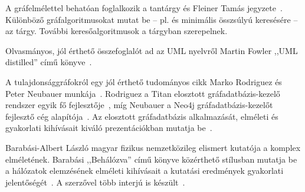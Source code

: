 A gráfelmélettel behatóan foglalkozik a \bszketto tantárgy és Fleiner Tamás jegyzete~\cite{FleinerJegyzet}. Különböző gráfalgoritmusokat mutat be -- pl.  és minimális összsúlyú  keresésére -- az \algel tárgy. További keresőalgoritmusok a \mestersegesintelligencia tárgyban szerepelnek.

Olvasmányos, jól érthető összefoglalót ad az UML nyelvről Martin Fowler ,,UML distilled'' című könyve~\cite{fowler1997uml}.

A tulajdonsággráfokról egy jól érthető tudományos cikk Marko Rodriguez és Peter Neubauer munkája~\cite{Rodriguez2010}. Rodriguez a Titan elosztott gráfadatbázis-kezelő rendszer egyik fő fejlesztője~\cite{Titan}, míg Neubauer a Neo4j gráfadatbázis-kezelőt fejlesztő cég alapítója~\cite{Neo4j}. Az elosztott gráfadatbázis alkalmazását, elméleti és gyakorlati kihívásait kiváló prezentációkban mutatja be~\cite{RodriguezSlides2012,RodriguezSlides2013}.

Barabási-Albert László magyar fizikus nemzetközileg elismert kutatója a komplex  elméletének. Barabási ,,Behálózva'' című könyve közérthető stílusban mutatja be a hálózatok elemzésének elméleti kihívásait a kutatási eredmények gyakorlati jelentőségét~\cite{behalozva}. A szerzővel több interjú is készült~\cite{barabasi1,barabasi2,barabasi3}.



